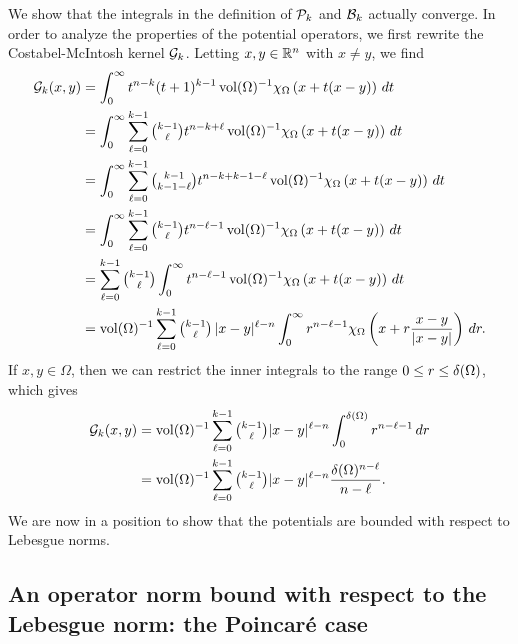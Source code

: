 \documentclass[10pt,a4paper]{article}
\begin{document}
We show that the integrals in the definition of ${\mathcal P}_{k}$ and ${\mathcal B}_{k}$ actually converge. 
In order to analyze the properties of the potential operators,
we first rewrite the Costabel-McIntosh kernel ${\mathcal G}_{k}$.
Letting $x,y \in {\mathbb R}^n$ with $x \neq y$, we find 
\begin{align*}
    {\mathcal G}_{k}(x,y) 
    &= 
    \int_{0}^{\infty} t^{n-k} (t+1)^{k-1} \operatorname{vol}(\Omega)^{-1} \chi_{\Omega} \left( x+t(x-y) \right)\,dt
    \\
    &= 
    \int_{0}^{\infty} \sum_{\ell=0}^{k-1} \tbinom{k-1}{\ell} t^{n-k+\ell} \operatorname{vol}(\Omega)^{-1} \chi_{\Omega} \left( x+t(x-y) \right)\,dt
    \\
    &= 
    \int_{0}^{\infty} \sum_{\ell=0}^{k-1} \tbinom{k-1}{k-1-\ell} t^{n-k+k-1-\ell} \operatorname{vol}(\Omega)^{-1} \chi_{\Omega} \left( x+t(x-y) \right)\,dt
    \\
    &= 
    \int_{0}^{\infty} \sum_{\ell=0}^{k-1} \tbinom{k-1}{\ell} t^{n-\ell-1} \operatorname{vol}(\Omega)^{-1} \chi_{\Omega} \left( x+t(x-y) \right)\,dt
    \\
    &= 
    \sum_{\ell=0}^{k-1} \tbinom{k-1}{\ell} \int_{0}^{\infty} t^{n-\ell-1} \operatorname{vol}(\Omega)^{-1} \chi_{\Omega}\left( x+t(x-y) \right)\,dt 
    \\
    &= 
    \operatorname{vol}(\Omega)^{-1} \sum_{\ell=0}^{k-1} \tbinom{k-1}{\ell} \, |x-y|^{\ell-n} \int_{0}^{\infty} r^{n-\ell-1} \chi_{\Omega}\left(x+r\frac{x-y}{|x-y|}\right)\,dr
    .
\end{align*}
If $x, y \in \Omega$, then we can restrict the inner integrals to the range $0 \leq r \leq {\delta}(\Omega)$, which gives 
\begin{align*}
    {\mathcal G}_{k}(x,y) 
    &= 
    \operatorname{vol}(\Omega)^{-1} \sum_{\ell=0}^{k-1}\tbinom{k-1}{\ell} |x-y|^{\ell-n} \int_{0}^{{\delta}(\Omega)} r^{n-\ell-1} \,dr 
    \\
    &= 
    \operatorname{vol}(\Omega)^{-1} \sum_{\ell=0}^{k-1}\tbinom{k-1}{\ell} |x-y|^{\ell-n} \frac{ {\delta}(\Omega)^{n-\ell} }{n-\ell}.
\end{align*}
We are now in a position to show that the potentials are bounded with respect to Lebesgue norms. 

\subsection{An operator norm bound with respect to the Lebesgue norm: the Poincar\'e case}
\end{document}
